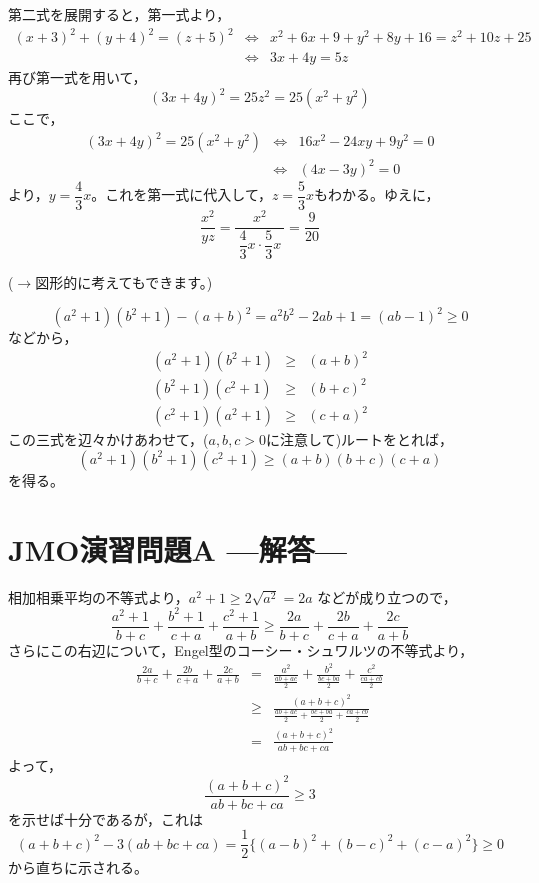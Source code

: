 \documentclass[a4paper,12pt]{jsarticle}
\begin{document}
\bigskip


第二式を展開すると，第一式より，
\begin{eqnarray*}
  (x+3)^{2} + (y+4)^{2} = (z+5)^{2} & \Leftrightarrow & x^{2}+6x+9 + y^{2}+8y+16 = z^{2}+10z+25 \\
  & \Leftrightarrow & 3x+4y = 5z
\end{eqnarray*}
再び第一式を用いて，
$$(3x+4y)^{2} = 25z^{2} = 25(x^{2}+y^{2})$$
ここで，
\begin{eqnarray*}
  (3x+4y)^{2} = 25(x^{2}+y^{2}) & \Leftrightarrow & 16x^{2}-24xy+9y^{2} = 0 \\
  & \Leftrightarrow & (4x-3y)^{2} = 0
\end{eqnarray*}
より，$y=\dfrac{4}{3}x$。これを第一式に代入して，$z=\dfrac{5}{3}x$もわかる。ゆえに，
$$ \frac{x^{2}}{yz} = \frac{x^{2}}{\ \dfrac{4}{3}x\cdot\dfrac{5}{3}x\ } = \frac{9}{20}$$

($\rightarrow$図形的に考えてもできます。)
\bigskip

$$(a^{2}+1)(b^{2}+1)-(a+b)^{2} = a^{2}b^{2}-2ab+1 = (ab-1)^{2} \geq 0$$
などから，
\begin{eqnarray*}
  (a^{2}+1)(b^{2}+1) &\geq& (a+b)^{2} \\
  (b^{2}+1)(c^{2}+1) &\geq& (b+c)^{2} \\
  (c^{2}+1)(a^{2}+1) &\geq& (c+a)^{2} 
\end{eqnarray*}
この三式を辺々かけあわせて，($a,b,c>0$に注意して)ルートをとれば，
$$ (a^{2}+1)(b^{2}+1)(c^{2}+1) \geq (a+b)(b+c)(c+a) $$
を得る。

\newpage

\section*{JMO演習問題A ---解答---} %


相加相乗平均の不等式より，$a^{2}+1 \geq 2\sqrt{a^{2}} = 2a$ などが成り立つので，
$$\frac {a^{2}+1}{b+c}+\frac {b^{2}+1}{c+a}+\frac {c^{2}+1}{a+b} \geq \frac {2a}{b+c}+\frac {2b}{c+a}+\frac {2c}{a+b}$$
さらにこの右辺について，Engel型のコーシー・シュワルツの不等式より，
\begin{eqnarray*}
  \frac {2a}{b+c}+\frac {2b}{c+a}+\frac {2c}{a+b} & = & \frac {a^{2}}{\frac{ab+ac}{2}}+\frac {b^{2}}{\frac{bc+ba}{2}}+\frac {c^{2}}{\frac{ca+cb}{2}} \\
  & \geq & \frac{(a+b+c)^{2}}{\frac{ab+ac}{2}+\frac{bc+ba}{2}+\frac{ca+cb}{2}} \\
  & = & \frac{(a+b+c)^{2}}{ab+bc+ca}
\end{eqnarray*}
よって，
$$\frac{(a+b+c)^{2}}{ab+bc+ca} \geq 3$$
を示せば十分であるが，これは
$$(a+b+c)^{2}-3(ab+bc+ca) = \frac{1}{2}\{(a-b)^{2}+(b-c)^{2}+(c-a)^{2}\} \geq 0$$
から直ちに示される。
\bigskip
\end{document}
